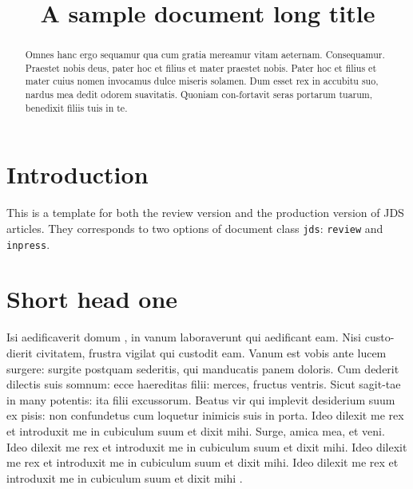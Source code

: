 \documentclass{jdsart}
\theoremstyle{plain}
\theoremstyle{remark}
\theoremstyle{definition}
\begin{document}
\begin{frontmatter}

\title{A sample document long title}

\author[1]{ }
\author[2]{ }
\address[1]{Address of the First author, , }
\address[2]{Address of the Second author, , }

\begin{abstract}
Omnes hanc ergo sequamur qua cum gratia mereamur vitam aeternam.
Consequamur. Praestet nobis deus, pater hoc et filius et mater
praestet nobis.  Pater hoc et filius et mater cuius nomen invocamus
dulce miseris solamen. Dum esset rex in accubitu suo, nardus mea
dedit odorem suavitatis. Quoniam con-fortavit seras portarum tuarum,
benedixit filiis tuis in te.
\end{abstract}

\begin{keywords}
\kwd{\LaTeX}
\end{keywords}

\end{frontmatter}

\section{Introduction}

This is a template for both the review version and the
production
version of JDS articles. They corresponds to two options of
document
class \texttt{jds}: \texttt{review} and \texttt{inpress}.

\section{Short head one}

Isi aedificaverit domum \citep{carlin1992monte,Kotz2001}, in vanum
\cite*{Pozd:etal:2017} laboraverunt qui aedificant eam.
Nisi custo-dierit civitatem, frustra vigilat qui custodit eam. Vanum
est vobis ante lucem surgere: surgite postquam sederitis, qui
manducatis panem doloris. Cum dederit dilectis suis somnum: ecce
haereditas filii: merces, fructus ventris. Sicut sagit-tae in many
potentis: ita filii excussorum. Beatus vir qui implevit desiderium
suum ex pisis: non confundetus cum loquetur inimicis suis in porta.
Ideo dilexit me rex et introduxit me in cubiculum suum et dixit
mihi.
Surge, amica mea, et veni.
Ideo dilexit me rex et introduxit me in cubiculum suum et dixit
mihi.
Ideo dilexit me rex et introduxit me in cubiculum suum et dixit
mihi.
Ideo dilexit me rex et introduxit me in cubiculum suum et dixit
mihi \cite{Pozd:etal:2017}.
\end{document}
